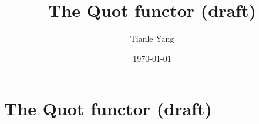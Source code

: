 \documentclass{noteformyself}
\title{The Quot functor (draft)}
\author{Tianle Yang}
\date{\today}
\begin{document}
    \maketitle

    \section{The Quot functor (draft)}



\end{document}
